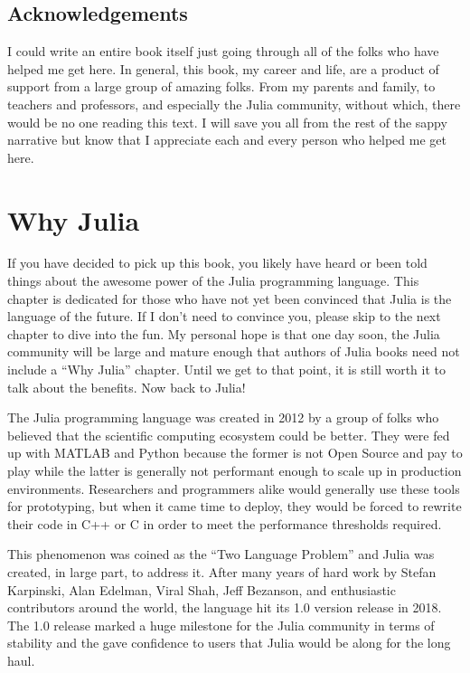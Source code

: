\documentclass[
  notoc %
]{tufte-book}
\begin{document}
\hypertarget{sec:acknowledgements}{%
\section{Acknowledgements}\label{sec:acknowledgements}}

I could write an entire book itself just going through all of the folks
who have helped me get here. In general, this book, my career and life,
are a product of support from a large group of amazing folks. From my
parents and family, to teachers and professors, and especially the Julia
community, without which, there would be no one reading this text. I
will save you all from the rest of the sappy narrative but know that I
appreciate each and every person who helped me get here.

\hypertarget{sec:why_julia}{%
\chapter{Why Julia}\label{sec:why_julia}}

If you have decided to pick up this book, you likely have heard or been
told things about the awesome power of the Julia programming language.
This chapter is dedicated for those who have not yet been convinced that
Julia is the language of the future. If I don't need to convince you,
please skip to the next chapter to dive into the fun. My personal hope
is that one day soon, the Julia community will be large and mature
enough that authors of Julia books need not include a ``Why Julia''
chapter. Until we get to that point, it is still worth it to talk about
the benefits. Now back to Julia!

The Julia programming language was created in 2012 by a group of folks
who believed that the scientific computing ecosystem could be better.
They were fed up with MATLAB and Python because the former is not Open
Source and pay to play while the latter is generally not performant
enough to scale up in production environments. Researchers and
programmers alike would generally use these tools for prototyping, but
when it came time to deploy, they would be forced to rewrite their code
in C++ or C in order to meet the performance thresholds required.

This phenomenon was coined as the ``Two Language Problem'' and Julia was
created, in large part, to address it. After many years of hard work by
Stefan Karpinski, Alan Edelman, Viral Shah, Jeff Bezanson, and
enthusiastic contributors around the world, the language hit its 1.0
version release in 2018. The 1.0 release marked a huge milestone for the
Julia community in terms of stability and the gave confidence to users
that Julia would be along for the long haul.
\end{document}

